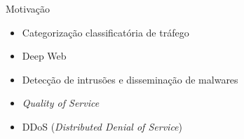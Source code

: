 \begin{frame}{Motivação}
 
    \begin{itemize}
      \item Categorização classificatória de tráfego \pause
      \item Deep Web \pause
      \item Detecção de intrusões e disseminação de malwares \pause
      \item \emph{Quality of Service} \pause
      \item DDoS (\emph{Distributed Denial of Service}) 
    \end{itemize}

\end{frame}